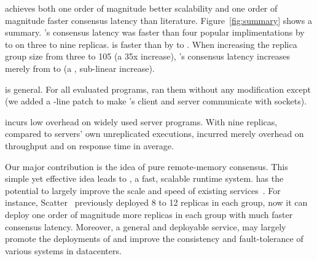 \begin{tightenum}
\item \xxx achieves both one order of magnitude better scalability and one 
order of magnitude faster consensus latency than literature. 
Figure~\ref{fig:summary} shows a summary. \xxx's consensus latency was faster 
than four popular \paxos implimentations by \comptradlow to \comptradhigh on 
three to nine replicas. \xxx is faster than \dare by \fasterDARElow to 
\fasterDARE. When increasing the replica group size from three to 105 (a 35x 
increase), \xxx's consensus latency increases merely from \xxxlatencythree to 
\xxxlatencyonezerofive (a \xxxscalability, sub-linear increase).

\item \xxx is general. For all \nprog evaluated programs, \xxx ran them without 
any modification except \calvin (we added a \nlinescalvin-line patch to make 
\calvin's client and server communicate with sockets).

\item \xxx incurs low overhead on \nprog widely used server programs. 
With nine replicas, compared to servers' own unreplicated executions, \xxx 
incurred merely \tputoverhead overhead on throughput and \latencyoverhead on 
response time in average.








\end{tightenum}  

Our major contribution is the idea of pure remote-memory consensus. This simple 
yet effective idea leads to \xxx, a fast, scalable \paxos runtime system. \xxx 
has the potential to largely improve the scale and speed of existing \paxos 
services~\cite{scatter:sosp11,manos:hotdep10,crane:sosp15,rex:eurosys14}. For 
instance, Scatter~\cite{scatter:sosp11} previously deployed 8 to 12 replicas in 
each \paxos group, now it can deploy one order of magnitude more replicas in 
each group with much faster consensus latency. Moreover, a general and 
deployable service, \xxx may largely promote the deployments of \paxos and 
improve the consistency and fault-tolerance of various systems in datacenters.


